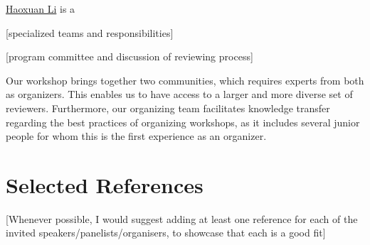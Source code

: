\documentclass{article}
\begin{document}
\href{https://scholar.google.com/citations?user=gtDqiucAAAAJ&hl=en}{Haoxuan Li} is a 


[specialized teams and responsibilities]

[program committee and discussion of reviewing process]

    Our workshop brings together two communities, which requires experts from both as organizers. This enables us to have access to a larger and more diverse set of reviewers. Furthermore, our organizing team facilitates knowledge transfer regarding the best practices of organizing workshops, as it includes several junior people for whom this is the first experience as an organizer. 

\section{Selected References}

{\color{blue}[Whenever possible, I would suggest adding at least one reference for each of the invited speakers/panelists/organisers, to showcase that each is a good fit]}


\renewcommand{\bibsection}{}


\nocite{liuLargeLanguageModels2024, anwar2024foundational, jin2024cladder, kasetty2024evaluating,park2023linear,zevcevic2023causal,vashishtha2023causal, reizinger2024understanding}
\nocite{gupta2024context_is_env, lampinen2023passive}
\nocite{daunhawer2023identifiability}







\end{document}
